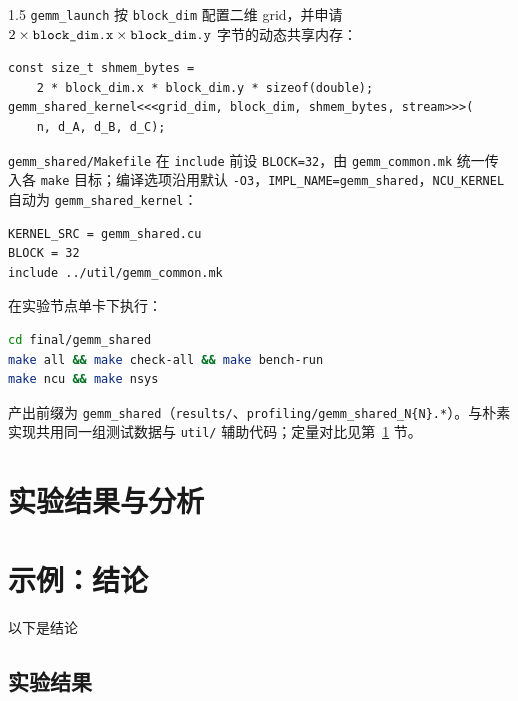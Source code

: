\documentclass[zihao=-4]{ctexart}
\begin{document}
\begin{spacing}{1.5}
\protect\texttt{gemm\_launch} 按 \protect\texttt{block\_dim} 配置二维 grid，并申请 $2\times\protect\texttt{block\_dim.x}\times\protect\texttt{block\_dim.y}$ 字节的动态共享内存：

\begin{lstlisting}[caption={共享内存 kernel 启动（\protect\texttt{gemm\_shared.cu}）}]
const size_t shmem_bytes =
    2 * block_dim.x * block_dim.y * sizeof(double);
gemm_shared_kernel<<<grid_dim, block_dim, shmem_bytes, stream>>>(
    n, d_A, d_B, d_C);
\end{lstlisting}

\protect\texttt{gemm\_shared/Makefile} 在 \protect\texttt{include} 前设 \protect\texttt{BLOCK=32}，由 \protect\texttt{gemm\_common.mk} 统一传入各 \protect\texttt{make} 目标；编译选项沿用默认 \protect\texttt{-O3}，\protect\texttt{IMPL\_NAME=gemm\_shared}，\protect\texttt{NCU\_KERNEL} 自动为 \protect\texttt{gemm\_shared\_kernel}：

\begin{lstlisting}[caption={共享内存目录 Makefile（\protect\texttt{gemm\_shared/Makefile}）}]
KERNEL_SRC = gemm_shared.cu
BLOCK = 32
include ../util/gemm_common.mk
\end{lstlisting}

在实验节点单卡下执行：

\begin{lstlisting}[language=bash, caption={共享内存 GEMM 实验命令}]
cd final/gemm_shared
make all && make check-all && make bench-run
make ncu && make nsys
\end{lstlisting}

产出前缀为 \protect\texttt{gemm\_shared}（\protect\texttt{results/}、\protect\texttt{profiling/gemm\_shared\_N\{N\}.*}）。与朴素实现共用同一组测试数据与 \protect\texttt{util/} 辅助代码；定量对比见第~\ref{sec:exp-result} 节。


\section{实验结果与分析}
\label{sec:exp-result}






\section{示例：结论}

以下是结论

\subsection{实验结果}


\end{spacing}
\end{document}
